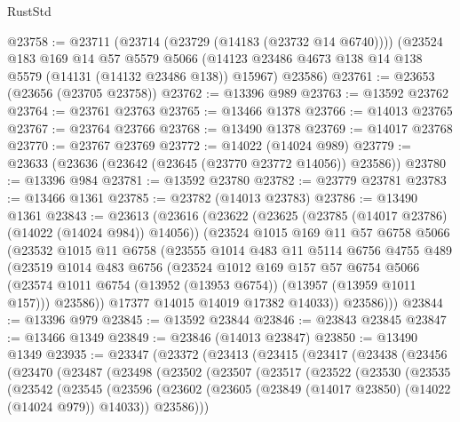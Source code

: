 \begin{lexlean}{RustStd}
\begin{coremodule}
@23758 := @23711
    (@23714 (@23729 (@14183 (@23732 @14 @6740))))
    (@23524
      @183
      @169
      @14
      @57
      @5579
      @5066
      (@14123 @23486 @4673 @138 @14 @138 @5579 (@14131 (@14132 @23486 @138)) @15967)
      @23586)
@23761 := @23653 (@23656 (@23705 @23758))
@23762 := @13396 @989
@23763 := @13592 @23762
@23764 := @23761 @23763
@23765 := @13466 @1378
@23766 := @14013 @23765
@23767 := @23764 @23766
@23768 := @13490 @1378
@23769 := @14017 @23768
@23770 := @23767 @23769
@23772 := @14022 (@14024 @989)
@23779 := @23633 (@23636 (@23642 (@23645 (@23770 @23772 @14056)) @23586))
@23780 := @13396 @984
@23781 := @13592 @23780
@23782 := @23779 @23781
@23783 := @13466 @1361
@23785 := @23782 (@14013 @23783)
@23786 := @13490 @1361
@23843 := @23613
    (@23616
      (@23622
        (@23625 (@23785 (@14017 @23786) (@14022 (@14024 @984)) @14056))
        (@23524
          @1015
          @169
          @11
          @57
          @6758
          @5066
          (@23532
            @1015
            @11
            @6758
            (@23555
              @1014
              @483
              @11
              @5114
              @6756
              @4755
              @489
              (@23519
                @1014
                @483
                @6756
                (@23524
                  @1012
                  @169
                  @157
                  @57
                  @6754
                  @5066
                  (@23574 @1011 @6754 (@13952 (@13953 @6754)) (@13957 (@13959 @1011 @157)))
                  @23586))
              @17377
              @14015
              @14019
              @17382
              @14033))
          @23586)))
@23844 := @13396 @979
@23845 := @13592 @23844
@23846 := @23843 @23845
@23847 := @13466 @1349
@23849 := @23846 (@14013 @23847)
@23850 := @13490 @1349
@23935 := @23347
    (@23372
      (@23413
        (@23415
          (@23417
            (@23438
              (@23456
                (@23470
                  (@23487
                    (@23498
                      (@23502
                        (@23507
                          (@23517
                            (@23522
                              (@23530
                                (@23535
                                  (@23542
                                    (@23545
                                      (@23596
                                        (@23602
                                          (@23605
                                            (@23849 (@14017 @23850) (@14022 (@14024 @979)) @14033))
                                          @23586)))

\end{coremodule}
\end{lexlean}
